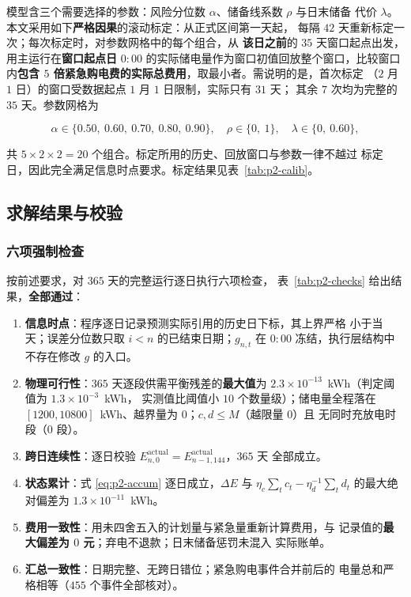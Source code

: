 \documentclass[withoutpreface,bwprint]{cumcmthesis}
\begin{document}
模型含三个需要选择的参数：风险分位数 $\alpha$、储备线系数 $\rho$ 与日末储备
代价 $\lambda$。本文采用如下\textbf{严格因果}的滚动标定：从正式区间第一天起，
每隔 $42$ 天重新标定一次；每次标定时，对参数网格中的每个组合，从
\textbf{该日之前}的 $35$ 天窗口起点出发，用主运行在\textbf{窗口起点日}
$0{:}00$ 的实际储电量作为窗口初值回放整个窗口，比较窗口内\textbf{包含
$5$ 倍紧急购电费的实际总费用}，取最小者。需说明的是，首次标定
（$2$ 月 $1$ 日）的窗口受数据起点 $1$ 月 $1$ 日限制，实际只有 $31$ 天；
其余 $7$ 次均为完整的 $35$ 天。参数网格为

\begin{equation}
  \alpha\in\{0.50,\ 0.60,\ 0.70,\ 0.80,\ 0.90\},\quad
  \rho\in\{0,\ 1\},\quad
  \lambda\in\{0,\ 0.60\} ,
  \label{eq:p2-grid}
\end{equation}

共 $5\times2\times2=20$ 个组合。标定所用的历史、回放窗口与参数一律不越过
标定日，因此完全满足信息时点要求。标定结果见表~\ref{tab:p2-calib}。

\subsection{求解结果与校验}

\subsubsection{六项强制检查}

按前述要求，对 $365$ 天的完整运行逐日执行六项检查，
表~\ref{tab:p2-checks} 给出结果，\textbf{全部通过}：

\begin{enumerate}
  \item \textbf{信息时点}：程序逐日记录预测实际引用的历史日下标，其上界严格
        小于当天；误差分位数只取 $i<n$ 的已结束日期；$g_{n,t}$ 在 $0{:}00$
        冻结，执行层结构中不存在修改 $g$ 的入口。
  \item \textbf{物理可行性}：$365$ 天逐段供需平衡残差的\textbf{最大值}为
        $2.3\times10^{-13}$~kWh（判定阈值为 $1.3\times10^{-3}$~kWh，
        实测值比阈值小 $10$ 个数量级）；储电量全程落在
        $[1200,10800]$~kWh、越界量为 $0$；$c,d\le M$（越限量 $0$）且
        无同时充放电时段（$0$ 段）。
  \item \textbf{跨日连续性}：逐日校验
        $E_{n,0}^{\mathrm{actual}}=E_{n-1,144}^{\mathrm{actual}}$，$365$ 天
        全部成立。
  \item \textbf{状态累计}：式 \eqref{eq:p2-accum} 逐日成立，$\Delta E$ 与
        $\eta_c\sum_t c_t-\eta_d^{-1}\sum_t d_t$ 的最大绝对偏差为
        $1.3\times10^{-11}$~kWh。
  \item \textbf{费用一致性}：用未四舍五入的计划量与紧急量重新计算费用，与
        记录值的\textbf{最大偏差为 $0$ 元}；弃电不退款；日末储备惩罚未混入
        实际账单。
  \item \textbf{汇总一致性}：日期完整、无跨日错位；紧急购电事件合并前后的
        电量总和严格相等（$455$ 个事件全部核对）。
\end{enumerate}
\end{document}
